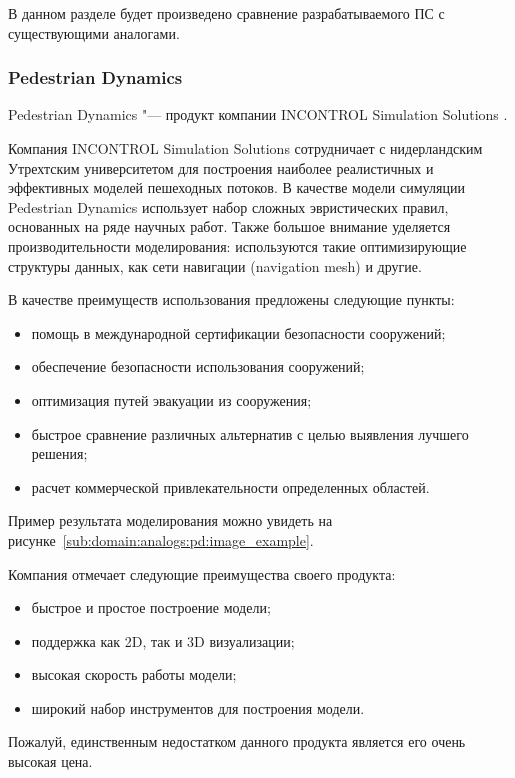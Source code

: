 В данном разделе будет произведено сравнение разрабатываемого ПС с существующими аналогами.

\subsubsection{Pedestrian Dynamics}
\label{sub:domain:analogs:pd}

\newcommand{\iss}{ IN\-CON\-TROL Si\-mu\-la\-ti\-on So\-lu\-ti\-ons }

Pedestrian Dynamics "--- продукт компании \iss.

Компания \iss сотрудничает с нидерландским Утрехтским университетом для построения наиболее реалистичных и эффективных моделей пешеходных потоков.
В качестве модели симуляции Pedestrian Dynamics использует набор сложных эвристических правил, основанных на ряде научных работ.
Также большое внимание уделяется производительности моделирования: используются такие оптимизирующие структуры данных, как сети навигации (navigation mesh) и другие.

В качестве преимуществ использования предложены следующие пункты:
\begin{itemize}
  \item помощь в международной сертификации безопасности сооружений;
  \item обеспечение безопасности использования сооружений;
  \item оптимизация путей эвакуации из сооружения;
  \item быстрое сравнение различных альтернатив с целью выявления лучшего решения;
  \item расчет коммерческой привлекательности определенных областей.
\end{itemize}

Пример результата моделирования можно увидеть на рисунке~\ref{sub:domain:analogs:pd:image_example}.

Компания отмечает следующие преимущества своего продукта:
\begin{itemize}
  \item быстрое и простое построение модели;
  \item поддержка как 2D, так и 3D визуализации;
  \item высокая скорость работы модели;
  \item широкий набор инструментов для построения модели.
\end{itemize}

Пожалуй, единственным недостатком данного продукта является его очень высокая цена.


